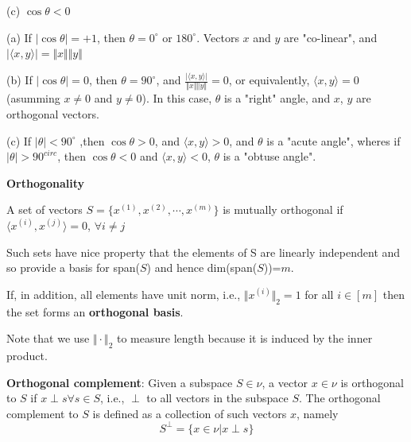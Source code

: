 \begin{marginfigure}
	\centering
	\resizebox{7.5cm}{3cm}{}
	\caption{(c) $\cos\theta<0$}
	\label{}
\end{marginfigure}

(a) If $\vert\cos\theta\vert = +1$, then $\theta=0^{\circ}$ or $180^{\circ}$. Vectors $x$ and $y$ are "co-linear", and $\vert\langle x,y\rangle\vert=\Vert x\Vert \Vert y\Vert$


(b) If $\vert\cos\theta\vert = 0$, then $\theta = 90^{\circ}$, and $\frac{\vert\langle x,y\rangle\vert}{\Vert x\Vert \Vert y\Vert}=0$, or equivalently, $\langle x,y\rangle=0$ (asumming $x\neq 0$ and $y\neq 0$). In this case, $\theta$ is a "right" angle, and $x$, $y$ are orthogonal vectors.

(c) If $\vert \theta\vert <90^{\circ}$ ,then $\cos\theta >0$, and $\langle x,y\rangle >0$, and $\theta$ is a "acute angle", wheres if $\vert \theta\vert >90^{circ}$, then $\cos\theta <0$ and $\langle x,y\rangle <0$, $\theta$ is a "obtuse angle".



\vspace{0.5cm}
\noindent\textbf{Orthogonality}

A set of vectors $S=\{x^{(1)}, x^{(2)},\cdots, x^{(m)}\}$ is mutually orthogonal if $\langle x^{(i)},x^{(j)}\rangle =0$, $\forall i\neq j$
					
Such sets have nice property that the elements of S are linearly independent and so provide a basis for span($S$) and hence dim(span($S$))=$m$.

If, in addition, all elements have unit norm, i.e., $\Vert x^{(i)}\Vert_{2}=1$ for all $i\in[m]$ then the set forms an \textbf{orthogonal basis}.

Note that we use $\Vert\cdot\Vert_{2}$ to measure length because it is induced by the inner product.




\vspace{0.3cm}
\textbf{Orthogonal complement}: Given a subspace $S\in \nu$, a vector $x\in\nu$ is orthogonal to $S$ if $x\perp s \forall s\in S$, i.e., $\perp$ to all vectors in the subspace $S$. The orthogonal complement to $S$ is defined as a collection of such vectors $x$, namely
$$ S^{\perp} =\{x\in\nu|x\perp s\}$$

